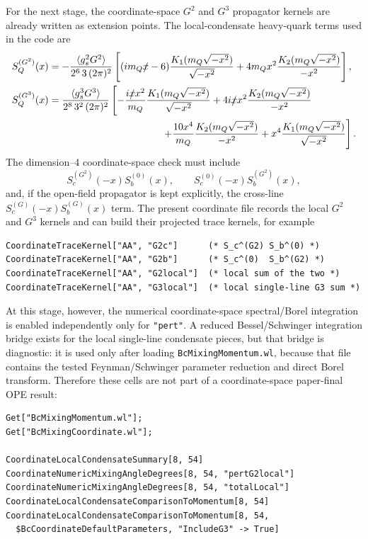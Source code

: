 \documentclass[11pt]{article}
\begin{document}
For the next stage, the coordinate-space \(G^2\) and \(G^3\) propagator
kernels are already written as extension points.  The local-condensate
heavy-quark terms used in the code are
\begin{align}
  S_Q^{(G^2)}(x)
  &=
  -\frac{\langle g_s^2G^2\rangle}
  {2^6\,3\,(2\pi)^2}
  \left[
    (im_Q\slashed{x}-6)
    \frac{K_1(m_Q\sqrt{-x^2})}{\sqrt{-x^2}}
    +4m_Qx^2
    \frac{K_2(m_Q\sqrt{-x^2})}{-x^2}
  \right],
  \\
  S_Q^{(G^3)}(x)
  &=
  \frac{\langle g_s^3G^3\rangle}
  {2^8\,3^2\,(2\pi)^2}
  \left[
    -\frac{i\slashed{x}x^2}{m_Q}
    \frac{K_1(m_Q\sqrt{-x^2})}{\sqrt{-x^2}}
    +4i\slashed{x}x^2
    \frac{K_2(m_Q\sqrt{-x^2})}{-x^2}
  \right.
  \nonumber\\
  &\hspace{4.0cm}\left.
    +\frac{10x^4}{m_Q}
    \frac{K_2(m_Q\sqrt{-x^2})}{-x^2}
    +x^4
    \frac{K_1(m_Q\sqrt{-x^2})}{\sqrt{-x^2}}
  \right].
\end{align}
The dimension--4 coordinate-space check must include
\begin{equation}
  S_c^{(G^2)}(-x)S_b^{(0)}(x),\qquad
  S_c^{(0)}(-x)S_b^{(G^2)}(x),
\end{equation}
and, if the open-field propagator is kept explicitly, the cross-line
\(S_c^{(G)}(-x)S_b^{(G)}(x)\) term.  The present coordinate file records the
local \(G^2\) and \(G^3\) kernels and can build their projected trace kernels,
for example
\begin{verbatim}
CoordinateTraceKernel["AA", "G2c"]      (* S_c^(G2) S_b^(0) *)
CoordinateTraceKernel["AA", "G2b"]      (* S_c^(0)  S_b^(G2) *)
CoordinateTraceKernel["AA", "G2local"]  (* local sum of the two *)
CoordinateTraceKernel["AA", "G3local"]  (* local single-line G3 sum *)
\end{verbatim}
At this stage, however, the numerical coordinate-space spectral/Borel
integration is enabled independently only for \texttt{"pert"}.  A reduced
Bessel/Schwinger integration bridge exists for the local single-line
condensate pieces, but that bridge is diagnostic: it is used only after
loading \texttt{BcMixingMomentum.wl}, because that file contains the tested
Feynman/Schwinger parameter reduction and direct Borel transform.  Therefore
these cells are not part of a coordinate-space paper-final OPE result:
\begin{verbatim}
Get["BcMixingMomentum.wl"];
Get["BcMixingCoordinate.wl"];

CoordinateLocalCondensateSummary[8, 54]
CoordinateNumericMixingAngleDegrees[8, 54, "pertG2local"]
CoordinateNumericMixingAngleDegrees[8, 54, "totalLocal"]
CoordinateLocalCondensateComparisonToMomentum[8, 54]
CoordinateLocalCondensateComparisonToMomentum[8, 54,
  $BcCoordinateDefaultParameters, "IncludeG3" -> True]
\end{verbatim}
\end{document}
